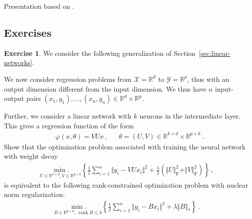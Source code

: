 \documentclass[11pt,reqno]{article}
\DeclareMathOperator{\rank}{rank}
\DeclareMathOperator{\Fro}{F}
\newcommand{\R}{\mathbb{R}}
\newcommand{\cX}{\mathcal{X}}
\newcommand{\cY}{\mathcal{Y}}
\renewcommand{\leq}{\leqslant}
\numberwithin{equation}{section}
\theoremstyle{plain}
\theoremstyle{definition}
\newtheorem{exercice}[assumption]{Exercise}
\theoremstyle{remark}
\begin{document}
Presentation based on \cite{berthier2023incremental,berthier2025diagonal}.

\subsection{Exercises}

\begin{exercice}
	\label{exer:linear-networks}
	We consider the following generalization of Section~\ref{sec:linear-networks}. 
	
	We now consider regression problems from $\cX = \R^d$ to $\cY = \R^p$, thus with an output dimension different from the input dimension. We thus have $n$ input-output pairs $(x_1, y_1), \dots, (x_n, y_n) \in \R^d \times \R^p$. 

Further, we consider a linear network with $k$ neurons in the intermediate layer. This gives a regression function of the form
\begin{align*}
	&\varphi(x, \theta) = VU x \, , &&\theta = (U,V) \in \R^{k \times d} \times \R^{p \times k} \, .
\end{align*}
Show that the optimization problem associated with training the neural network with weight decay
\begin{align*}
	\underset{U \in \R^{k \times d},V \in \R^{p \times k}}{\min.} \left\{\frac{1}{2} \sum_{i=1}^{n} \Vert y_i - VU x_i \Vert^2 + \frac{\lambda}{2} \left(\Vert U \Vert_{\Fro}^2 + \Vert V \Vert_{\Fro}^2\right) \right\} \, ,
\end{align*}
is equivalent to the following rank-constrained optimization problem with nuclear norm regularization:
\begin{align*}
	\underset{B\in \R^{p\times d}, \, \rank B \leq k}{\min.} \left\{\frac{1}{2} \sum_{i=1}^{n} \Vert y_i - B x_i \Vert^2 + \lambda \Vert B \Vert_* \right\} \, . 
\end{align*}
\end{exercice}
\end{document}
